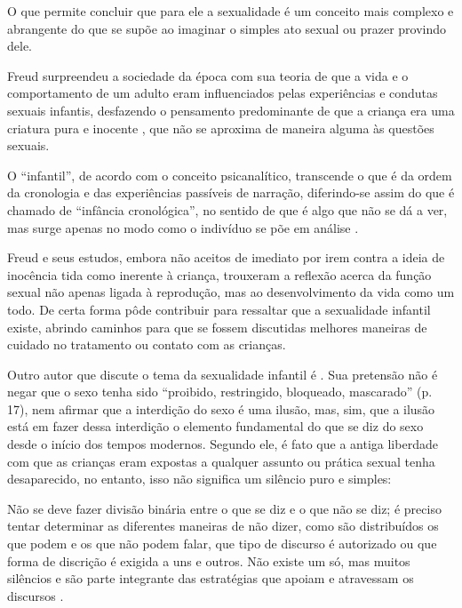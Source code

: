 O que permite concluir que para ele a sexualidade é um conceito mais complexo e abrangente do que se supõe ao imaginar o simples ato sexual ou prazer provindo dele.

Freud surpreendeu a sociedade da época com sua teoria de que a vida e o comportamento de um adulto eram influenciados pelas experiências e condutas sexuais infantis, desfazendo o pensamento predominante de que a criança era uma criatura pura e inocente \cite{SCHINDHELM2011}, que não se aproxima de maneira alguma às questões sexuais.

O ``infantil'', de acordo com o conceito psicanalítico, transcende o que é da ordem da cronologia e das experiências passíveis de narração, diferindo-se assim do que é chamado de ``infância cronológica'', no sentido de que é algo que não se dá a ver, mas surge apenas no modo como o indivíduo se põe em análise \cite[p. 66]{ZAVARONI2007}.

Freud e seus estudos, embora não aceitos de imediato por irem contra a ideia de inocência tida como inerente à criança, trouxeram a reflexão acerca da função sexual não apenas ligada à reprodução, mas ao desenvolvimento da vida como um todo. De certa forma pôde contribuir para ressaltar que a sexualidade infantil existe, abrindo caminhos para que se fossem discutidas melhores maneiras de cuidado no tratamento ou contato com as crianças.  

Outro autor que discute o tema da sexualidade infantil é . Sua pretensão não é negar que o sexo tenha sido ``proibido, restringido, bloqueado, mascarado'' (p. 17), nem afirmar que a interdição do sexo é uma ilusão, mas, sim, que a ilusão está em fazer dessa interdição o elemento fundamental do que se diz do sexo desde o início dos tempos modernos. Segundo ele, é fato que a antiga liberdade com que as crianças eram expostas a qualquer assunto ou prática sexual tenha desaparecido, no entanto, isso não significa um silêncio puro e simples:

\begin{citacao}
	Não se deve fazer divisão binária entre o que se diz e o que não se diz; é preciso tentar determinar as diferentes maneiras de não dizer, como são distribuídos os que podem e os que não podem falar, que tipo de discurso é autorizado ou que forma de discrição é exigida a uns e outros. Não existe um só, mas muitos silêncios e são parte integrante das estratégias que apoiam e atravessam os discursos \cite[p. 30]{FOUCAULT1988}.
\end{citacao}

